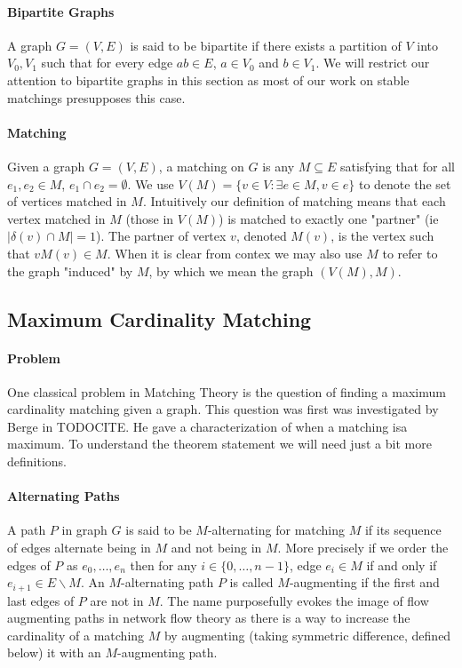 \paragraph{Bipartite Graphs} A graph $G = (V,E)$ is said to be bipartite if there exists a partition of $V$ into $V_0, V_1$ such that for every edge $ab \in E$, $a \in V_0$ and $b \in V_1$. We will restrict our attention to bipartite graphs in this section as most of our work on stable matchings presupposes this case.
\paragraph{Matching} Given a graph $G = (V,E)$, a matching on $G$ is any $M \subseteq E$ satisfying that for all $e_1, e_2 \in M$, $e_1 \cap e_2 = \emptyset$. We use $V(M) = \{v \in V: \exists e \in M, v \in e\}$ to denote the set of vertices matched in $M$. Intuitively our definition of matching means that each vertex matched in $M$ (those in $V(M)$) is matched to exactly one "partner" (ie $|\delta(v) \cap M| = 1$). The partner of vertex $v$, denoted $M(v)$, is the vertex such that $vM(v) \in M$. When it is clear from contex we may also use $M$ to refer to the graph "induced" by $M$, by which we mean the graph $(V(M), M)$.
\subsection{Maximum Cardinality Matching}
\paragraph{Problem} One classical problem in Matching Theory is the question of finding a maximum cardinality matching given a graph. This question was first was investigated by Berge in TODOCITE. He gave a characterization of when a matching isa maximum. To understand the theorem statement we will need just a bit more definitions.
\paragraph{Alternating Paths} A path $P$ in graph $G$ is said to be $M$-alternating for matching $M$ if its sequence of edges alternate being in $M$ and not being in $M$. More precisely if we order the edges of $P$ as $e_0, \dots, e_{n}$ then for any $i \in \{0, \dots, n-1\}$, edge $e_i \in M$ if and only if $e_{i+1} \in E \backslash M$. An $M$-alternating path $P$ is called $M$-augmenting if the first and last edges of $P$ are not in $M$. The name purposefully evokes the image of flow augmenting paths in network flow theory as there is a way to increase the cardinality of a matching $M$ by augmenting (taking symmetric difference, defined below) it with an $M$-augmenting path.
